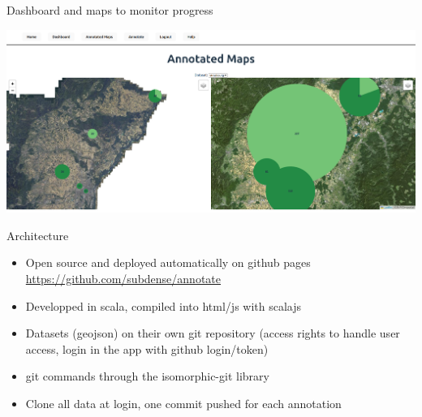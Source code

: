 \documentclass{beamer}
\begin{document}
\begin{frame}{Dashboard and maps to monitor progress}

\begin{center}
	\includegraphics[width=\linewidth]{figures/example_annotatordashboard.png}
\end{center}

\end{frame}



\begin{frame}{Architecture}



\begin{itemize}
	\item Open source and deployed automatically on github pages \url{https://github.com/subdense/annotate}
	\item Developped in scala, compiled into html/js with scalajs
	\item Datasets (geojson) on their own git repository (access rights to handle user access, login in the app with github login/token)
	\item git commands through the isomorphic-git library
	\item Clone all data at login, one commit pushed for each annotation 
\end{itemize}



\end{frame}
\end{document}
